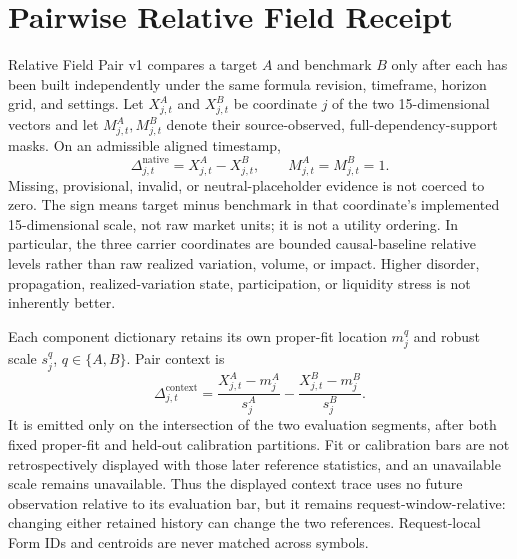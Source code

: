 \documentclass{article}
\begin{document}
\section{Pairwise Relative Field Receipt}
\label{app:relative-pair}

Relative Field Pair v1 compares a target $A$ and benchmark $B$ only after each has been built independently under the same formula revision, timeframe, horizon grid, and settings. Let $X^A_{j,t}$ and $X^B_{j,t}$ be coordinate $j$ of the two 15-dimensional vectors and let $M^A_{j,t},M^B_{j,t}$ denote their source-observed, full-dependency-support masks. On an admissible aligned timestamp,
\begin{equation}
    \Delta^{\mathrm{native}}_{j,t}
    =X^A_{j,t}-X^B_{j,t},
    \qquad M^A_{j,t}=M^B_{j,t}=1 .
\end{equation}
Missing, provisional, invalid, or neutral-placeholder evidence is not coerced to zero. The sign means target minus benchmark in that coordinate's implemented 15-dimensional scale, not raw market units; it is not a utility ordering. In particular, the three carrier coordinates are bounded causal-baseline relative levels rather than raw realized variation, volume, or impact. Higher disorder, propagation, realized-variation state, participation, or liquidity stress is not inherently better.

Each component dictionary retains its own proper-fit location $m^q_j$ and robust scale $s^q_j$, $q\in\{A,B\}$. Pair context is
\begin{equation}
    \Delta^{\mathrm{context}}_{j,t}
    =\frac{X^A_{j,t}-m^A_j}{s^A_j}
     -\frac{X^B_{j,t}-m^B_j}{s^B_j}.
\end{equation}
It is emitted only on the intersection of the two evaluation segments, after both fixed proper-fit and held-out calibration partitions. Fit or calibration bars are not retrospectively displayed with those later reference statistics, and an unavailable scale remains unavailable. Thus the displayed context trace uses no future observation relative to its evaluation bar, but it remains request-window-relative: changing either retained history can change the two references. Request-local Form IDs and centroids are never matched across symbols.
\end{document}
